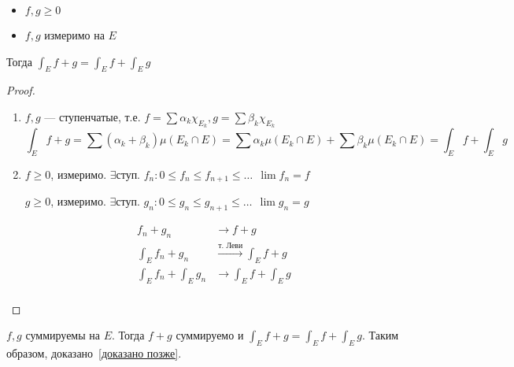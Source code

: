 \begin{theorem}\itemfix
    \begin{itemize}
        \item \(f, g \geq 0\)
        \item \(f, g\) измеримо на \(E\)
    \end{itemize}
    Тогда \(\int_E f + g = \int_E f + \int_E g\)
\end{theorem}
\begin{proof}\itemfix
    \begin{enumerate}
        \item \(f, g\) --- ступенчатые, т.е. \(f = \sum \alpha_k \chi_{E_k}, g = \sum \beta_k \chi_{E_k}\)
              \[\int_E f + g = \sum (\alpha_k + \beta_k)\mu(E_k\cap E) = \sum \alpha_k \mu (E_k \cap E) + \sum \beta_k \mu (E_k \cap E) = \int_E f + \int_E g\]

        \item \(f \geq 0\), измеримо. \(\exists \text{ступ. } f_n : 0 \leq f_n \leq f_{n+1} \leq \dots \ \ \lim f_n = f\)

              \(g \geq 0\), измеримо. \(\exists \text{ступ. } g_n : 0 \leq g_n \leq g_{n+1} \leq \dots \ \ \lim g_n = g\)

              \begin{align*}
                  f_n + g_n               & \to f + g                                 \\
                  \int_E f_n + g_n        & \xrightarrow{\text{т. Леви}} \int_E f + g \\
                  \int_E f_n + \int_E g_n & \to \int_E f + \int_E g                   \\
              \end{align*}
    \end{enumerate}
\end{proof}

\begin{corollary}
    \(f, g\) суммируемы на \(E\). Тогда \(f + g\) суммируемо и \(\int_{E} f + g = \int_E f + \int_E g\). Таким образом, доказано~\ref{доказано позже}.
\end{corollary}

